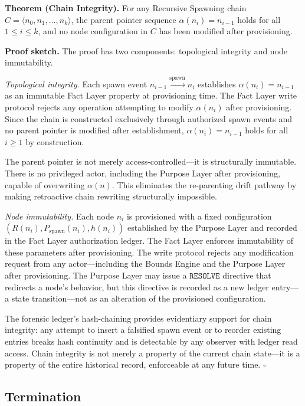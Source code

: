 \medskip
\noindent\textbf{Theorem (Chain Integrity).} For any Recursive Spawning chain $C = \langle n_0, n_1, \ldots, n_k \rangle$, the parent pointer sequence $\alpha(n_i) = n_{i-1}$ holds for all $1 \leq i \leq k$, and no node configuration in $C$ has been modified after provisioning.

\medskip
\noindent\textbf{Proof sketch.} The proof has two components: topological integrity and node immutability.

\medskip
\textit{Topological integrity.} Each spawn event $n_{i-1} \xrightarrow{\mathrm{spawn}} n_i$ establishes $\alpha(n_i) = n_{i-1}$ as an immutable Fact Layer property at provisioning time. The Fact Layer write protocol rejects any operation attempting to modify $\alpha(n_i)$ after provisioning. Since the chain is constructed exclusively through authorized spawn events and no parent pointer is modified after establishment, $\alpha(n_i) = n_{i-1}$ holds for all $i \geq 1$ by construction.

The parent pointer is not merely access-controlled---it is structurally immutable. There is no privileged actor, including the Purpose Layer after provisioning, capable of overwriting $\alpha(n)$. This eliminates the re-parenting drift pathway by making retroactive chain rewriting structurally impossible.

\medskip
\textit{Node immutability.} Each node $n_i$ is provisioned with a fixed configuration $(R(n_i), P_{\mathrm{spawn}}(n_i), h(n_i))$ established by the Purpose Layer and recorded in the Fact Layer authorization ledger. The Fact Layer enforces immutability of these parameters after provisioning. The write protocol rejects any modification request from any actor---including the Bounds Engine and the Purpose Layer after provisioning. The Purpose Layer may issue a $\texttt{RESOLVE}$ directive that redirects a node's behavior, but this directive is recorded as a new ledger entry---a state transition---not as an alteration of the provisioned configuration.

The forensic ledger's hash-chaining provides evidentiary support for chain integrity: any attempt to insert a falsified spawn event or to reorder existing entries breaks hash continuity and is detectable by any observer with ledger read access. Chain integrity is not merely a property of the current chain state---it is a property of the entire historical record, enforceable at any future time. $\square$

\subsection{Termination}
\label{sec:rs-termination}

